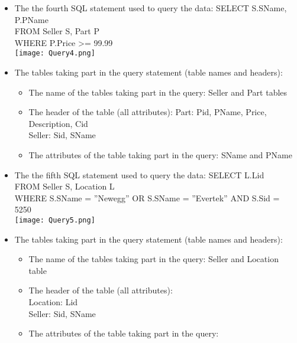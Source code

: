 {\begin{itemize}
	 \begin{itemize} 
	 \item{The name of the tables taking part in the query: }
	 Part and Review table
	  \item{The header of the table  (all attributes): }
	  Part: Pid, PName, Price, Description, Cid \\
	  Review: Pid, Rid, Rating, Review Description
	  \item{The attributes of the table taking part in the query: }
	   Pid, rating
	 \end{itemize}
	 \item{The the fourth SQL statement used to query the data: }
	SELECT S.SName, P.PName \\FROM Seller S, Part P\\WHERE P.Price >= 99.99\\
	\texttt{[image: Query4.png]} 
\item{The tables taking part in the query statement (table names and headers): }
	 \begin{itemize} 
	 \item{The name of the tables taking part in the query: }
	 Seller and Part tables
	  \item{The header of the table  (all attributes): }
	  Part: Pid, PName, Price, Description, Cid \\
	  Seller: Sid, SName
	  \item{The attributes of the table taking part in the query: }
	   SName and PName
	 \end{itemize}
	 \item{The the fifth SQL statement used to query the data: }
	SELECT L.Lid \\FROM Seller S, Location L\\WHERE S.SName = ''Newegg'' OR S.SName = ''Evertek'' AND S.Sid = 5250\\
	\texttt{[image: Query5.png]} 
\item{The tables taking part in the query statement (table names and headers): }
	 \begin{itemize} 
	 \item{The name of the tables taking part in the query: }
	 Seller and Location table
	  \item{The header of the table  (all attributes): }\\
	  Location: Lid \\
	  Seller: Sid, SName
	  \item{The attributes of the table taking part in the query: }

\end{itemize}
\end{itemize}}

